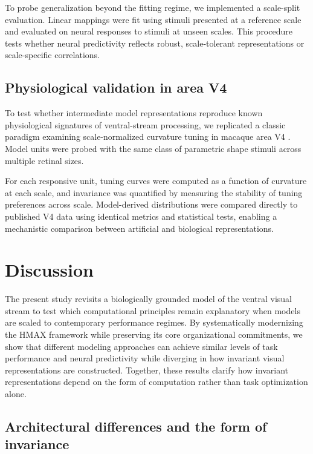 \documentclass[pdflatex,sn-nature]{sn-jnl}
\begin{document}
To probe generalization beyond the fitting regime, we implemented a scale-split evaluation. Linear mappings were fit using stimuli presented at a reference scale and evaluated on neural responses to stimuli at unseen scales. This procedure tests whether neural predictivity reflects robust, scale-tolerant representations or scale-specific correlations. 

\subsection{Physiological validation in area V4}

To test whether intermediate model representations reproduce known physiological signatures of ventral-stream processing, we replicated a classic paradigm examining scale-normalized curvature tuning in macaque area V4 \citep{ElShamayleh2016Curvature}. Model units were probed with the same class of parametric shape stimuli across multiple retinal sizes. 

For each responsive unit, tuning curves were computed as a function of curvature at each scale, and invariance was quantified by measuring the stability of tuning preferences across scale. Model-derived distributions were compared directly to published V4 data using identical metrics and statistical tests, enabling a mechanistic comparison between artificial and biological representations.

\section{Discussion}

The present study revisits a biologically grounded model of the ventral visual stream to test which computational principles remain explanatory when models are scaled to contemporary performance regimes. By systematically modernizing the HMAX framework while preserving its core organizational commitments, we show that different modeling approaches can achieve similar levels of task performance and neural predictivity while diverging in how invariant visual representations are constructed. Together, these results clarify how invariant representations depend on the form of computation rather than task optimization alone.

\subsection{Architectural differences and the form of invariance}
\end{document}
